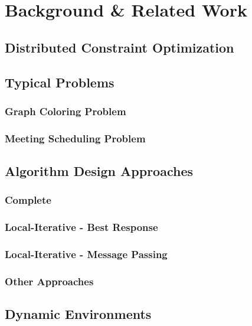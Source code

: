 \chapter{Background \& Related Work}
\section{Distributed Constraint Optimization}
\section{Typical Problems}
\subsection{Graph Coloring Problem}
\subsection{Meeting Scheduling Problem}
\section{Algorithm Design Approaches}
\subsection{Complete}
\subsection{Local-Iterative - Best Response}
\subsection{Local-Iterative - Message Passing}
\subsection{Other Approaches}
\section{Dynamic Environments}

%
%
%
